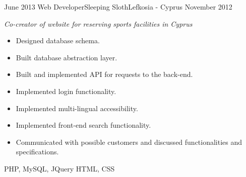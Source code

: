 \begin{experiences}
    \experience
      {June 2013}
      {Web Developer}{Sleeping Sloth}{Lefkosia - Cyprus}
      {November 2012}
      {
        \emph{Co-creator of website for reserving sports facilities in Cyprus}
        \begin{itemize}
          \item Designed database schema.
          \item Built database abstraction layer.
          \item Built and implemented API for requests to the back-end.
          \item Implemented login functionality.
          \item Implemented multi-lingual accessibility.
          \item Implemented front-end search functionality.
          \item Communicated with possible customers and discussed functionalities and specifications.
        \end{itemize}
      }
      {PHP, MySQL, JQuery}
      {HTML, CSS}
  \end{experiences}
